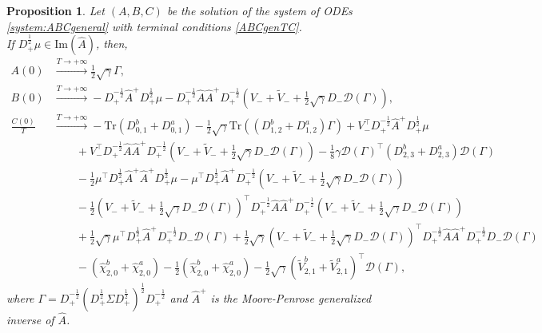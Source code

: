 \documentclass[preprint, 3p]{elsarticle}
\newcommand{\1}{{\chi}}
\newtheorem{proposition}{Proposition}
\begin{document}
\begin{proposition}\label{prop:GENode_asymp_solution}
Let $(A,B,C)$ be the solution of the system of ODEs \eqref{system:ABCgeneral} with terminal conditions \eqref{ABCgenTC}.\\

If $D_+^{\frac 12} \mu \in \text{Im}(\widehat A)$, then,
\begingroup
\allowdisplaybreaks
\begin{align*}
A(0) & \stackrel{T\to+\infty}{\longrightarrow} \frac{1}{2}\sqrt{\gamma}\Gamma, \\
B(0) & \stackrel{T\to+\infty}{\longrightarrow} - D_+^{-\frac 12} \widehat A^+ D_+^{\frac 12} \mu - D_+^{-\frac 12}\widehat A \widehat A ^+ D_+^{-\frac 12} \left( V_- + \tilde V_-
     + \frac{1}{2}\sqrt{\gamma}  D_- \mathcal D(\Gamma) \right),\\
\frac{C(0)}T & \stackrel{T\to+\infty}{\longrightarrow} -\textrm{Tr}\left(D^b_{0,1} + D^a_{0,1}\right) -\frac{1}{2}\sqrt{\gamma} \textrm{Tr}\left(\left(D^b_{1,2} + D^a_{1,2}\right)\Gamma\right) + V_-^\intercal D_+^{-\frac 12} \widehat A^+ D_+^{\frac 12} \mu \\
&\qquad + V_-^\intercal D_+^{-\frac 12}\widehat{A}\widehat{A}^+ D_+^{-\frac 12}\!\left(V_- + \tilde V_-
     + \frac{1}{2}\sqrt{\gamma}  D_- \mathcal D(\Gamma)\right)\!\!-\!\frac 18 \gamma \mathcal{D}(\Gamma)^\intercal\!\!\left(D^b_{2,3}\! +\! D^a_{2,3}\right) \mathcal{D}(\Gamma)\\
     &\qquad - \frac 12 \mu^\intercal D_+^{\frac 12}\widehat A ^+ \widehat A^+ D_+^{\frac 12} \mu - \mu^\intercal D_+^{\frac 12} \widehat A ^+ D_+^{-\frac 12} \left(V_- + \tilde V_-
     + \frac{1}{2}\sqrt{\gamma}  D_- \mathcal D(\Gamma)\right) \\
          &\qquad - \frac 12 \left(V_- + \tilde V_-
     + \frac{1}{2}\sqrt{\gamma}  D_- \mathcal D(\Gamma)\right)^\intercal\! D_+^{-\frac 12}\widehat{A}\widehat{A}^+ D_+^{-\frac 12} \left(V_- + \tilde V_-
     + \frac{1}{2}\sqrt{\gamma}  D_- \mathcal D(\Gamma)\right)\\
     &\qquad + \frac{1}{2}\sqrt{\gamma} \mu^\intercal  D_+^{\frac 12} \widehat A^+ D_+^{-\frac 12} D_- \mathcal D(\Gamma)  + \frac{1}{2}\sqrt{\gamma} \left(V_- + \tilde V_-
     + \frac{1}{2}\sqrt{\gamma}  D_- \mathcal D(\Gamma)\right)^\intercal D_+^{-\frac 12}\widehat{A}\widehat{A}^+ D_+^{-\frac 12}  D_- \mathcal{D}(\Gamma) \\
     &\qquad - \left(\hat{\chi}^{b}_{2,0} + \hat{\chi}^{a}_{2,0} \right) - \frac 12 \left(\hat{\chi}^{b}_{2,0} + \hat{\chi}^{a}_{2,0} \right) - \frac 12 \sqrt{\gamma} \left( {\tilde{V}^{b}_{2,1}} + {\tilde{V }^{a}_{2,1}} \right)^\intercal \mathcal{D}(\Gamma),
\end{align*}
\endgroup
where $\Gamma = D_+^{-\frac 1 2} \left( D_+^{\frac 12} \Sigma D_+^{\frac 12} \right)^{\frac 12}
            D_+^{-\frac 1 2}$ and $\widehat{A}^+$ is the Moore-Penrose generalized inverse of
$\widehat{A}$.\\
\end{proposition}
\end{document}
